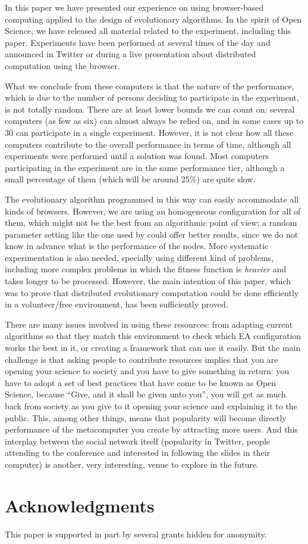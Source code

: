 \documentclass{sig-alternate}
\begin{document}
In this paper we have presented our experience on using browser-based
computing applied to the design of evolutionary algorithms. In the
spirit of Open Science, we have released all material related to the
experiment, including this paper. Experiments have been performed at
several times of the day and announced in Twitter or during a live
presentation about distributed computation using the browser. 

What we conclude from these computers is that the nature of the
performance, which is due to the number of persons deciding to
participate in the experiment, is not totally random. There are at
least lower bounds we can count on: several computers (as few as six)
can almost always be relied on, and in some cases up to 30 can
participate in a single experiment. However, it is not clear how all
these computers contribute to the overall performance in terms of
time, although all experiments were performed until a solution was
found. Most computers participating in the experiment are in the same
performance tier, although a small percentage of them (which will be
around 25\%) are quite slow.

The evolutionary algorithm programmed in this way can easily
accommodate all kinds of browsers. However, we are using an homogeneous
configuration for all of them, which might not be the best from an
algorithmic point of view; a random parameter setting like the one
used by \cite{LNCS86720702} could offer better results, since we do
not know in advance what is the performance of the nodes. More
systematic experimentation is also needed, specially using different
kind of problems, including more complex problems in which the fitness
function is {\em heavier} and takes longer to be processed. However,
the main intention of this paper, which was to prove that distributed
evolutionary computation could be done efficiently in a volunteer/free
environment, has been sufficiently proved. 

There are many issues involved in using these resources: from adapting
current algorithms so that they match this environment 
to check which EA configuration works the best in it, or creating a
framework that can use it easily. But the main
challenge is that asking people to contribute resources implies that
you are opening your science to society and you have to give something
in return: you have to adopt a set of best practices that have come to
be known as Open Science, because ``Give, and it shall be given unto
you'', you will get as much back from society as you give to it
opening your science and explaining it to the public. This, among
other things, means that popularity will become directly performance
of the metacomputer you create by attracting more users. And this
interplay between the social network itself (popularity in Twitter,
people attending to the conference and interested in following the
slides in their computer) is another, very interesting, venue to
explore in the future. 

\section{Acknowledgments}

This paper is supported in part by several grants hidden for
anonymity. 



\end{document}
